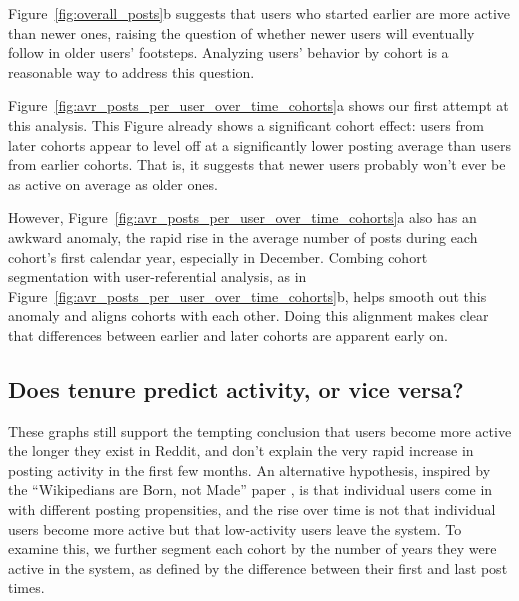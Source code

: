 \begin{figure*}[!tb]
\centering
{}
\caption{Figure (a) shows the average number of posts per active users over clock time and Figure (b) the active users in the user-time referential, both segmented by users' cohorts. The user cohort is defined as the year the user made his/her first post.  For comparison, the black lines represent the overall averages from Figure~\ref{fig:overall_posts}.}
\label{fig:avr_posts_per_user_over_time_cohorts}
\end{figure*}

Figure~\ref{fig:overall_posts}b suggests that users who started earlier are more active than newer ones, raising the question of whether newer users
will eventually follow in older users' footsteps.  Analyzing users' behavior by cohort is a reasonable way to address this question.  

Figure~\ref{fig:avr_posts_per_user_over_time_cohorts}a shows our first attempt at this analysis.  This Figure already shows a significant cohort effect: users from later cohorts appear to level off at a significantly lower posting average than users from earlier cohorts.  That is, it suggests that newer users probably won't ever be as active on average as older ones.

However, Figure~\ref{fig:avr_posts_per_user_over_time_cohorts}a also has an awkward anomaly, the rapid rise in the average number of posts during each cohort's first calendar year, especially in December.  
Combing cohort segmentation with user-referential analysis, as in Figure~\ref{fig:avr_posts_per_user_over_time_cohorts}b, helps smooth out this anomaly and aligns cohorts with each other.  Doing this alignment makes clear that differences between earlier and later cohorts are apparent early on.

\subsection{Does tenure predict activity, or vice versa?}

These graphs still support the tempting conclusion that users become more active the longer they exist in Reddit, and don't explain the very rapid increase in posting activity in the first few months.  An alternative hypothesis, inspired by the ``Wikipedians are Born, not Made'' paper \cite{}, is that individual users come in with different posting propensities, and the rise over time is not that individual users become more active but that low-activity users leave the system.  To examine this, we further segment each cohort by the number of years they were active in the system, as defined by the difference between their first and last post times.
 
